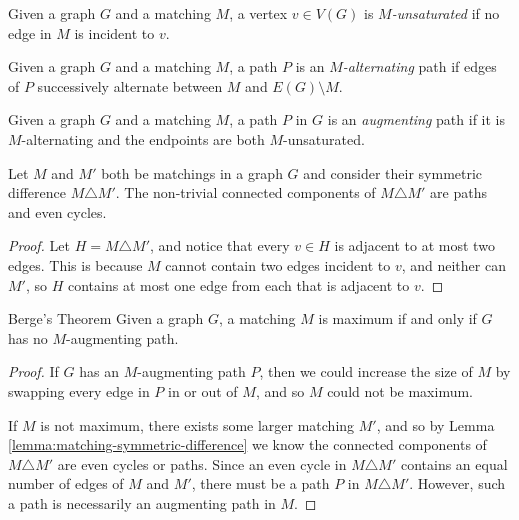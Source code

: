 \begin{defn}
    Given a graph $G$ and a matching $M$, a vertex $v \in V(G)$ is \emph{$M$-unsaturated} if no edge in $M$ is incident to $v$.
\end{defn}

\begin{defn}
    Given a graph $G$ and a matching $M$, a path $P$ is an \emph{$M$-alternating} path if edges of $P$ successively alternate between $M$ and $E(G) \setminus M$.
\end{defn}

\begin{defn}
    Given a graph $G$ and a matching $M$, a path $P$ in $G$ is an \emph{augmenting} path if it is $M$-alternating and the endpoints are both $M$-unsaturated.
\end{defn}

\begin{lemma}\label{lemma:matching-symmetric-difference}
    Let $M$ and $M'$ both be matchings in a graph $G$ and consider their symmetric difference $M \triangle M'$. The non-trivial connected components of $M \triangle M'$ are paths and even cycles.
\end{lemma}

\begin{proof}
    Let $H = M \triangle M'$, and notice that every $v \in H$ is adjacent to at most two edges. This is because $M$ cannot contain two edges incident to $v$, and neither can $M'$, so $H$ contains at most one edge from each that is adjacent to $v$.
\end{proof}

\begin{thm}{Berge's Theorem}\label{thm:berge-matching}\proofbreak
    Given a graph $G$, a matching $M$ is maximum if and only if $G$ has no $M$-augmenting path.
\end{thm}

\begin{proof}
    If $G$ has an $M$-augmenting path $P$, then we could increase the size of $M$ by swapping every edge in $P$ in or out of $M$, and so $M$ could not be maximum.

    If $M$ is not maximum, there exists some larger matching $M'$, and so by Lemma \ref{lemma:matching-symmetric-difference} we know the connected components of $M \triangle M'$ are even cycles or paths. Since an even cycle in $M \triangle M'$ contains an equal number of edges of $M$ and $M'$, there must be a path $P$ in $M \triangle M'$. However, such a path is necessarily an augmenting path in $M$.
\end{proof}

